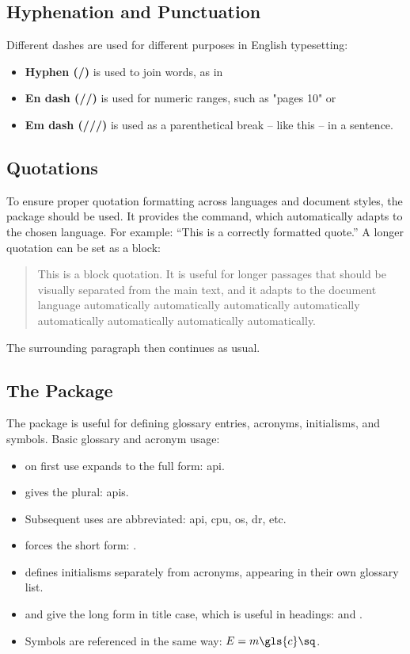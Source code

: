 \subsection{Hyphenation and Punctuation}

Different dashes are used for different purposes in English typesetting:
\begin{itemize}
  \item \textbf{Hyphen (\-/)} is used to join words, as in 
  \item \textbf{En dash (\-/\-/)} is used for numeric ranges, such as "pages 10" or 
  \item \textbf{Em dash (\-/\-/\-/)} is used as a parenthetical break \--- like this \--- in a sentence.
\end{itemize}

\subsection{Quotations}

To ensure proper quotation formatting across languages and document styles, the  package should be used. It provides the \latexinline{\enquote} command, which automatically adapts to the chosen language. For example: \enquote{This is a correctly formatted quote.} A longer quotation can be set as a block:
\blockquote{This is a block quotation. It is useful for longer passages that should be visually separated from the main text, and it adapts to the document language automatically automatically automatically automatically automatically automatically automatically automatically.} The surrounding paragraph then continues as usual.

\subsection{The  Package}

The  package is useful for defining glossary entries, acronyms, initialisms, and symbols. Basic glossary and acronym usage:

\begin{itemize}
  \item \latexinline{\gls{}} on first use expands to the full form: \gls{api}.
  \item \latexinline{\glspl{}} gives the plural: \glspl{api}.
  \item Subsequent uses are abbreviated: \gls{api}, \gls{cpu}, \gls{os}, \gls{dr}, \gls{etc}.
  \item \latexinline{\glsxtrshort{}} forces the short form: .
  \item \latexinline{\newinitialism{}} defines initialisms separately from acronyms, appearing in their own glossary list.
  \item \latexinline{\tgls{}} and \latexinline{\tglspl{}} give the long form in title case, which is useful in headings:  and .
  \item Symbols are referenced in the same way: $E = m\gls{c}\sq$.
\end{itemize}

